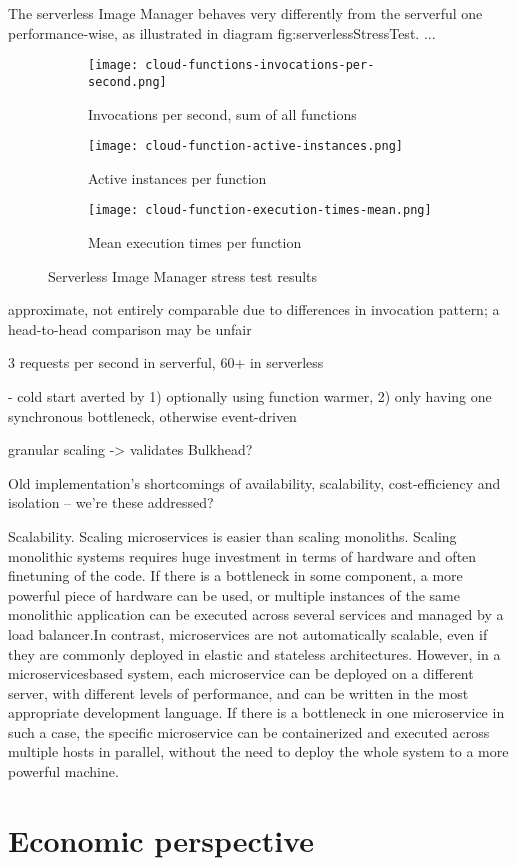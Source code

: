 The serverless Image Manager behaves very differently from the serverful one performance-wise, as illustrated in diagram {fig:serverlessStressTest}. ...

\begin{figure}
  \centering
  \begin{subfigure}[b]{0.9\textwidth}
      \texttt{[image: cloud-functions-invocations-per-second.png]}
      \caption{Invocations per second, sum of all functions}
      \label{fig:tiger}
  \end{subfigure}

  \begin{subfigure}[b]{0.9\textwidth}
      \texttt{[image: cloud-function-active-instances.png]}
      \caption{Active instances per function}
      \label{fig:gull}
  \end{subfigure}

  \begin{subfigure}[b]{0.9\textwidth}
      \texttt{[image: cloud-function-execution-times-mean.png]}
      \caption{Mean execution times per function}
      \label{fig:mouse}
  \end{subfigure}
  \caption{Serverless Image Manager stress test results}\label{fig:serverlessStressTest}
\end{figure}


approximate, not entirely comparable due to differences in invocation pattern; a head-to-head comparison may be unfair

3 requests per second in serverful, 60+ in serverless

- cold start averted by 1) optionally using function warmer, 2) only having one synchronous bottleneck, otherwise event-driven

granular scaling -> validates Bulkhead?

Old implementation's shortcomings of availability, scalability, cost-efficiency and isolation -- we're these addressed?

Scalability. Scaling microservices is easier than scaling  monoliths.  Scaling  monolithic  systems  requires  huge  investment  in  terms  of  hardware  and  often  finetuning  of  the  code.  If  there  is  a  bottleneck  in  some  component,  a  more  powerful  piece  of  hardware can be used, or multiple instances of the same monolithic  application  can  be  executed  across  several services and managed by a load balancer.In   contrast,   microservices   are   not   automatically  scalable,  even  if  they  are  commonly  deployed  in  elastic  and  stateless  architectures.  However,  in  a  microservicesbased  system,  each  microservice  can  be deployed on a different server, with different levels of  performance,  and  can  be  written  in  the  most  appropriate  development  language.  If  there  is  a  bottleneck  in  one  microservice  in  such  a  case,  the  specific microservice can be containerized and executed across multiple hosts in parallel, without the need to deploy the whole system to a more powerful machine.



\section{Economic perspective}

